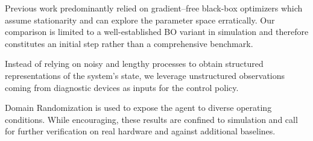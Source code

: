 {Previous work predominantly relied on gradient–free black-box optimizers which assume stationarity and can explore the parameter space erratically. Our comparison is limited to a well-established BO variant in simulation and therefore constitutes an initial step rather than a comprehensive benchmark.}

{Instead of relying on noisy and lengthy processes to obtain structured representations of the system's state, we leverage unstructured observations coming from diagnostic devices as inputs for the control policy.}

{Domain Randomization is used to expose the agent to diverse operating conditions. While encouraging, these results are confined to simulation and call for further verification on real hardware and against additional baselines.}